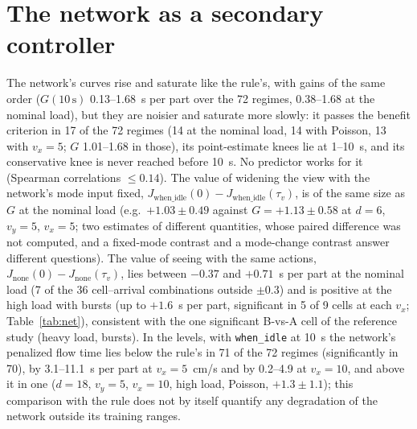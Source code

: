 \documentclass[11pt,a4paper]{article}
\newcommand{\tv}{\tau_{v}}
\begin{document}
\section{The network as a secondary controller}\label{sup:benchnet}
The network's curves rise and saturate like the rule's, with gains of the same order
($G(10\,\mathrm{s})$ 0.13--1.68~s per part over the 72 regimes, 0.38--1.68 at the nominal
load), but they are noisier and saturate more slowly: it passes the benefit criterion in
17 of the 72 regimes (14 at the nominal load, 14 with Poisson, 13 with $v_x=5$; $G$
1.01--1.68 in those), its point-estimate knees lie at 1--10~s, and its conservative knee is never
reached before 10~s. No predictor works for it (Spearman correlations $\le0.14$). The
value of widening the view with the network's mode input fixed,
$J_{\mathrm{when\_idle}}(0)-J_{\mathrm{when\_idle}}(\tv)$, is of the same size as $G$ at the
nominal load (e.g.\ $+1.03\pm0.49$ against $G=+1.13\pm0.58$ at $d=6$, $v_y=5$, $v_x=5$;
two estimates of different quantities, whose paired difference was not computed, and a
fixed-mode contrast and a mode-change contrast answer different questions). The value of seeing with
the same actions, $J_{\mathrm{none}}(0)-J_{\mathrm{none}}(\tv)$, lies between $-0.37$ and
$+0.71$~s per part at the nominal load (7 of the 36 cell--arrival combinations outside
$\pm0.3$) and is positive at the high load with bursts (up to $+1.6$~s per
part, significant in 5 of 9 cells at each $v_x$; Table~\ref{tab:net}), consistent with
the one significant B-vs-A cell of the reference study (heavy load, bursts). In the levels, with
\texttt{when\_idle} at 10~s the network's penalized flow time lies below the rule's in 71
of the 72 regimes (significantly in 70), by 3.1--11.1~s per part at $v_x=5$~cm/s and by
0.2--4.9 at $v_x=10$, and above it in one ($d=18$, $v_y=5$, $v_x=10$, high load, Poisson,
$+1.3\pm1.1$); this comparison with the rule does not by itself quantify any degradation
of the network outside its training ranges.

\begin{table}[t]
\centering\small
\caption{Geometry bench, network: per block of $v_x\times$load$\times$arrivals (nine
geometries each), the number of cells worth sizing for, the range of $G(10\,\mathrm{s})$,
the range of the point-estimate knee in those cells, and the range of the value of seeing
with the same actions, $J_{\mathrm{none}}(0)-J_{\mathrm{none}}(10\,\mathrm{s})$ [s per
part], with the number of cells in which it is significantly positive (cells in which it
is significantly negative, one in each of four blocks, are not counted).}
\label{tab:net}
\resizebox{\linewidth}{!}{}
\end{table}
\end{document}

